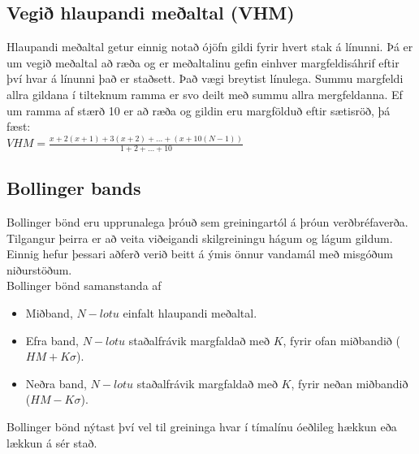 \documentclass[11pt]{article}
\begin{document}
\subsection{Vegið hlaupandi meðaltal (VHM)}
Hlaupandi meðaltal getur einnig notað ójöfn gildi fyrir hvert stak á línunni.
Þá er um vegið meðaltal að ræða og er meðaltalinu gefin einhver margfeldisáhrif eftir því hvar á línunni það er staðsett. 
Það vægi breytist línulega. Summu margfeldi allra gildana í tilteknum ramma er svo deilt með summu allra mergfeldanna. 
Ef um ramma af stærð 10 er að ræða og gildin eru margfölduð eftir sætisröð, þá fæst: \\
$VHM = \frac{x+2(x+1)+3(x+2)+\dots+(x+10(N-1))}{1+2+\dots+10}$


\subsection{Bollinger bands}
\label{sec:third}

Bollinger bönd eru upprunalega þróuð sem greiningartól á þróun verðbréfaverða. 
Tilgangur þeirra er að veita viðeigandi skilgreiningu hágum og lágum gildum. Einnig hefur þessari aðferð verið beitt á ýmis önnur
vandamál með misgóðum niðurstöðum. \\

Bollinger bönd samanstanda af
\begin{itemize}
  \item Miðband, $N-lotu$ einfalt hlaupandi meðaltal.
  \item Efra band, $N-lotu$ staðalfrávik margfaldað með $K$, fyrir ofan miðbandið ($HM + K\sigma$).
  \item Neðra band, $N-lotu$ staðalfrávik margfaldað með $K$, fyrir neðan miðbandið ($HM - K\sigma$).
\end{itemize}
Bollinger bönd nýtast því vel til greininga hvar í tímalínu óeðlileg hækkun eða lækkun á sér stað.
\end{document}
